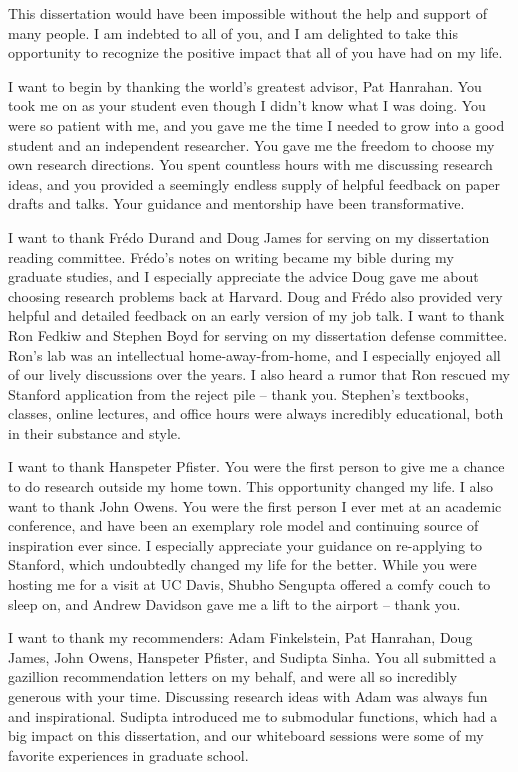 
This dissertation would have been impossible without the help and support of many people.
I am indebted to all of you, and I am delighted to take this opportunity to recognize the positive impact that all of you have had on my life.

I want to begin by thanking the world's greatest advisor, Pat Hanrahan.
You took me on as your student even though I didn't know what I was doing.
You were so patient with me, and you gave me the time I needed to grow into a good student and an independent researcher.
You gave me the freedom to choose my own research directions.
You spent countless hours with me discussing research ideas, and you provided a seemingly endless supply of helpful feedback on paper drafts and talks.
Your guidance and mentorship have been transformative.

I want to thank Fr{\'e}do Durand and Doug James for serving on my dissertation reading committee.
Fr{\'e}do's notes on writing became my bible during my graduate studies, and I especially appreciate the advice Doug gave me about choosing research problems back at Harvard.
Doug and Fr{\'e}do also provided very helpful and detailed feedback on an early version of my job talk. I want to thank Ron Fedkiw and Stephen Boyd for serving on my dissertation defense committee.
Ron's lab was an intellectual home-away-from-home, and I especially enjoyed all of our lively discussions over the years.
I also heard a rumor that Ron rescued my Stanford application from the reject pile -- thank you.
Stephen's textbooks, classes, online lectures, and office hours were always incredibly educational, both in their substance and style.

I want to thank Hanspeter Pfister.
You were the first person to give me a chance to do research outside my home town.
This opportunity changed my life.
I also want to thank John Owens.
You were the first person I ever met at an academic conference, and have been an exemplary role model and continuing source of inspiration ever since.
I especially appreciate your guidance on re-applying to Stanford, which undoubtedly changed my life for the better.
While you were hosting me for a visit at UC Davis, Shubho Sengupta offered a comfy couch to sleep on, and Andrew Davidson gave me a lift to the airport -- thank you.

I want to thank my recommenders:
Adam Finkelstein, Pat Hanrahan, Doug James, John Owens, Hanspeter Pfister, and Sudipta Sinha.
You all submitted a gazillion recommendation letters on my behalf, and were all so incredibly generous with your time.
Discussing research ideas with Adam was always fun and inspirational.
Sudipta introduced me to submodular functions, which had a big impact on this dissertation, and our whiteboard sessions were some of my favorite experiences in graduate school.


